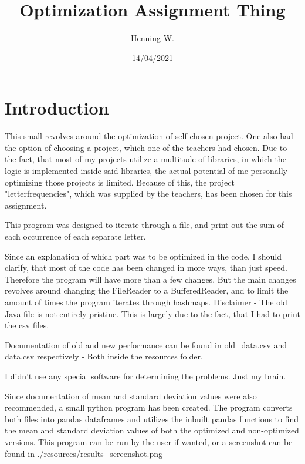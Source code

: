 \documentclass[a4paper, 12pt]{report}
\begin{document}
\title{\Large{\textbf{Optimization Assignment Thing}}}
\author{Henning W.}
\date{14/04/2021}
\maketitle
\tableofcontents
\setcounter{page}{2}
\fancyhf{}
\renewcommand{\headrulewidth}{2pt}
\renewcommand{\headrulewidth}{2pt}
\pagestyle{fancy} %
\fancyhf{} %
\fancyfoot[R]{\thepage}

\fancypagestyle{plain}{%
    \renewcommand{\headrulewidth}{0pt}%
    \fancyhf{}%
    \fancyfoot[R]{\thepage}%
}

\chapter{Introduction}
This small revolves around the optimization of self-chosen project. One also had the option of choosing a project, which one of the teachers had chosen. Due to the fact, that most of my projects utilize a multitude of libraries, in which the logic is implemented inside said libraries, the actual potential of me personally optimizing those projects is limited. Because of this, the project "letterfrequencies", which was supplied by the teachers, has been chosen for this assignment.

This program was designed to iterate through a file, and print out the sum of each occurrence of each separate letter. 

Since an explanation of which part was to be optimized in the code, I should clarify, that most of the code has been changed in more ways, than just speed. Therefore the program will have more than a few changes. But the main changes revolves around changing the FileReader to a BufferedReader, and to limit the amount of times the program iterates through hashmaps. Disclaimer - The old Java file is not entirely pristine. This is largely due to the fact, that I had to print the csv files. 

Documentation of old and new performance can be found in old\_data.csv and data.csv respectively - Both inside the resources folder.

I didn't use any special software for determining the problems. Just my brain.

Since documentation of mean and standard deviation values were also recommended, a small python program has been created. The program converts both files into pandas dataframes and utilizes the inbuilt pandas functions to find the mean and standard deviation values of both the optimized and non-optimized versions. This program can be run by the user if wanted, or a screenshot can be found in ./resources/results\_screenshot.png
\end{document}
